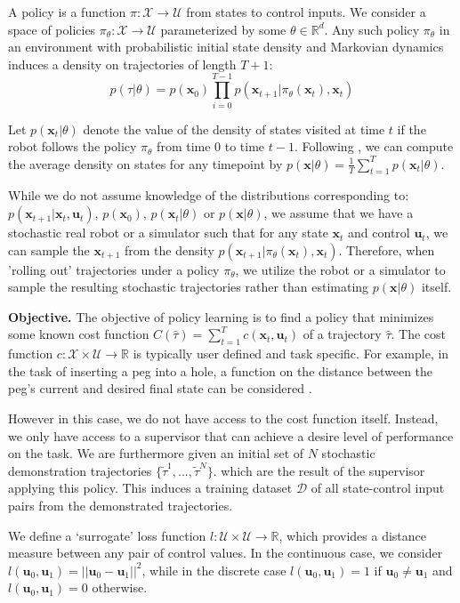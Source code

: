 \documentclass[10pt, conference]{ieeeconf}      %
\newcommand{\bu}{\mathbf{u}}
\newcommand{\bx}{\mathbf{x}}
\begin{document}
A policy is a function $\pi: \mathcal{X} \to \mathcal{U}$ from states to control inputs. 
We consider a space of policies $\pi_{\theta}:\mathcal{X}\to \mathcal{U}$ parameterized by some $\theta\in \mathbb{R}^d$. Any such policy $\pi_{\theta}$ in an environment with probabilistic initial state density and Markovian dynamics
induces a density on trajectories of length $T+1$: $$p(\tau | \theta)=
p(\bx_0)\prod_{i=0}^{T-1}p(\bx_{t+1}|\pi_{\theta}(\bx_t),\bx_t)$$


Let $p(\bx_t|\theta)$ denote the value of the density of states visited at time $t$ if the robot follows the policy
$\pi_{\theta}$ from time $0$ to time $t-1$.  Following \cite{ross2010reduction}, we can compute
the average density on states for any timepoint by $p(\bx|\theta) = \frac{1}{T} \sum^T_{t=1} p(\bx_t|\theta)$.


While we do not assume knowledge of the distributions corresponding to: $p(\bx_{t+1}|\bx_t,\bu_t)$, $p(\bx_0)$, $p(\bx_t|
\theta)$ or $p(\bx|\theta)$, we assume that we have a stochastic real robot or a simulator such that for any state
$\bx_t$ and control $\bu_t$, we can sample the $\bx_{t+1}$ from the density $p(\bx_{t+1}|\pi_{\theta}(\bx_t),\bx_t)$. 
Therefore, when 'rolling out' trajectories under a policy
$\pi_{\theta}$, we utilize the robot or a simulator to sample the resulting stochastic trajectories rather than
estimating $p(\bx|\theta)$ itself.

\noindent\textbf{Objective.} The objective of  policy learning is to find a policy that minimizes some known cost function $C(\hat{\tau}) = \sum^T_{t=1} c(\bx_t,\bu_t)$ of a trajectory $\hat{\tau}$. The cost function $c:\mathcal{X}\times \mathcal{U}\to \mathbb{R}$ is typically user defined and task specific. 
For example, in the task of inserting a peg into a hole, a function on the distance between the peg's current and desired final state can
be considered \cite{levine2015end}.  

However in this case, we do not have access to the cost function itself. Instead, we only have access to 
a supervisor that can achieve a desire level of performance on the task.  We are furthermore given
an initial set of $N$ stochastic demonstration trajectories $\lbrace \tilde{\tau}^1,...,\tilde{\tau}^N \rbrace$. 
which are the result of the supervisor applying this policy. This induces a training dataset $\mathcal{D}$ of all state-control input pairs from the demonstrated trajectories. 

We define a `surrogate' loss function $l:\mathcal{U}\times \mathcal{U}\to \mathbb{R}$, which provides a distance
measure between any pair of control values. In the continuous case, we consider $l(\bu_0,\bu_1) = ||\bu_0-\bu_1||^2$,
while in the discrete case $l(\bu_0,\bu_1) = 1$ if $\bu_0 \neq \bu_1$ and $l(\bu_0, \bu_1)=0$ otherwise.
\end{document}
